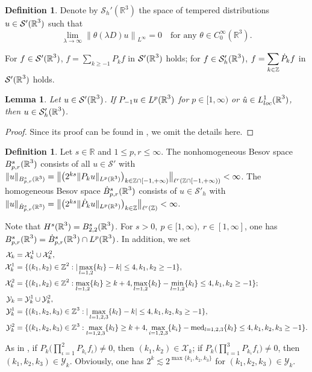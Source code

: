 \documentclass[11pt,twoside]{article}
\def\cX{\mathcal X}
\def\cY{\mathcal Y}
\def\Z{\mathop{\mathbb Z\kern 0pt}\nolimits}
\def\R{\mathop{\mathbb R\kern 0pt}\nolimits}
\def\ds{\displaystyle}
\def\ls{\lesssim}
\newcommand{\pk}{\dot{P}_k}
\theoremstyle{plain}
\newtheorem{lemma}[theorem]{Lemma}
\theoremstyle{definition}
\newtheorem{definition}[theorem]{Definition}
\theoremstyle{assumption}
\numberwithin{equation}{section}
\begin{document}
	\begin{definition}
		Denote by $\mathcal{S}_h'(\mathbb{R}^3)$ the space of tempered distributions $u\in\mathcal{S}'(\R^3)$ such that
		\[
		\lim_{\lambda \to \infty} \left\| \theta(\lambda D) u \right\|_{L^\infty} = 0 \quad \text{for any } \theta\in  C_0^{\infty}(\mathbb{R}^3).
		\]
	\end{definition}
	For $f\in\mathcal{S}'(\R^3)$, $f=\ds\sum_{k\ge-1}P_kf$ in $\mathcal{S}'(\R^3)$ holds;
	for $f\in\mathcal{S}'_h(\R^3)$, $f=\ds\sum_{k\in\Z}\pk f$ in $\mathcal{S}'(\R^3)$ holds.
	\begin{lemma}
		Let $u \in \mathcal{S}'(\R^3)$. If $P_{-1}u\in L^p(\R^3)$ for $p\in[1,\infty)$ or $\hat{u}\in L^1_{loc}(\R^3)$, then $u \in \mathcal{S}'_h(\R^3)$.
	\end{lemma}
	\begin{proof}
		Since its proof can be found in \cite[Chapter 1]{Chemin}, we omit the details here.
	\end{proof}
	\begin{definition}\label{YHC-30}
		Let \( s \in \mathbb{R} \) and \( 1 \leq p, r \leq \infty \). The nonhomogeneous Besov space \( B^s_{p,r}(\R^3) \) consists of all  \( u\in \mathcal{S}' \) with $\|u\|_{B^s_{p,r}(\R^3)}= \big\| \big( 2^{ks} \|P_k u\|_{L^p(\R^3)} \big)_{k \in \mathbb{Z}\cap[- 1,+\infty)} \big\|_{\ell^r(\mathbb{Z}\cap[- 1,+\infty))} < \infty$.  The homogeneous Besov space \( \dot{B}^s_{p,r}(\R^3)\) consists of \( u\in \mathcal{S}'_h \) with $\|u\|_{\dot{B}^s_{p,r}(\R^3)}= \big\|\big( 2^{ks} \|\pk  u\|_{L^p(\R^3)}\big)_{k \in \mathbb{Z}}\big\|_{\ell^r(\mathbb{Z})}<\infty$.
	\end{definition}
	Note that $H^s(\R^3)=B^s_{2,2}(\R^3)$. For $s>0,\ p\in[1,\infty),\ r\in[1,\infty]$, one has $B^s_{p,r}(\R^3) = \dot{B}^s_{p,r}(\R^3)\cap L^p(\R^3)$.
	In addition, we set
	\begin{equation*}
		\begin{split}
			\cX_k&=\cX_k^1\cup\cX_k^2,\\
			\cX_k^1&=\{(k_1,k_2)\in\Z^2: |\max_{l=1,2}\{k_l\}-k|\le4,k_1,k_2\ge-1\},\\
			\cX_k^2&=\{(k_1,k_2)\in\Z^2: \max_{l=1,2}\{k_l\}\ge k+4,
			\max_{l=1,2}\{k_l\}-\min_{l=1,2}\{k_l\}\le4,k_1,k_2\ge-1\};\\
			\cY_k&=\cY_k^1\cup\cY_k^2,\\
			\cY_k^1&=\{(k_1,k_2,k_3)\in\Z^3: |\max_{l=1,2,3}\{k_l\}-k|\le4, k_1,k_2,k_3\ge-1\},\\
			\cY_k^2&=\{(k_1,k_2,k_3)\in\Z^3: \max_{l=1,2,3}\{k_l\}\ge k+4,
			\max_{i=1,2,3}\{k_i\}-{\rm med}_{l=1,2,3}\{k_l\}\le4, k_1,k_2,k_3\ge-1\}.
		\end{split}
	\end{equation*}
	As in \cite[page 799]{IP13}, if $P_k\big(\prod_{\iota=1}^2 P_{k_\iota}f_\iota\big)\neq0$,
	then $(k_1,k_2)\in\cX_k$; if $P_k\big(\prod_{\iota=1}^3 P_{k_\iota}f_\iota\big)\neq0$, then $(k_1,k_2,k_3)\in\cY_k$.
	Obviously, one has $2^k\ls 2^{\max\{k_1,k_2,k_3\}}$ for $(k_1,k_2,k_3)\in\cY_k$.
	
\end{document}
